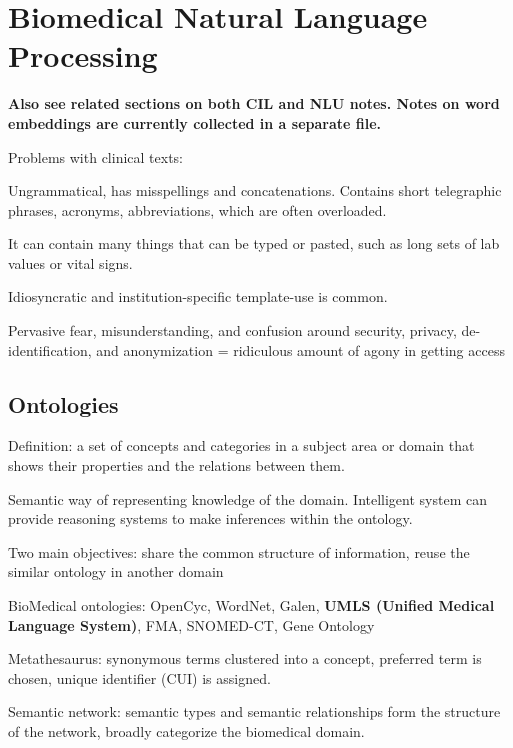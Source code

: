 \documentclass[12pt]{article}
\begin{document}
\section{Biomedical Natural Language Processing}
\textbf{Also see related sections on both CIL and NLU notes. Notes on word embeddings are currently collected in a separate file.}

\par Problems with clinical texts:
\ulb
\item Ungrammatical, has misspellings and concatenations. Contains short telegraphic phrases, acronyms, abbreviations, which are often overloaded.
\item It can contain many things that can be typed or pasted, such as long sets of lab values or vital signs.
\item Idiosyncratic and institution-specific template-use is common.
\item Pervasive fear, misunderstanding, and confusion around security, privacy, de-identification, and anonymization = ridiculous amount of agony in getting access
\ule

\subsection{Ontologies}
\par Definition: a set of concepts and categories in a subject area or domain that shows their properties and the relations between them.
\par Semantic way of representing knowledge of the domain. Intelligent system can provide reasoning systems to make inferences within the ontology.
\par Two main objectives: share the common structure of information, reuse the similar ontology in another domain
\par BioMedical ontologies: OpenCyc, WordNet, Galen, \textbf{UMLS (Unified Medical Language System)}, FMA, SNOMED-CT, Gene Ontology
\par Metathesaurus: synonymous terms clustered into a concept, preferred term is chosen, unique identifier (CUI) is assigned.
\par Semantic network: semantic types and semantic relationships form the structure of the network, broadly categorize the biomedical domain.
\end{document}
